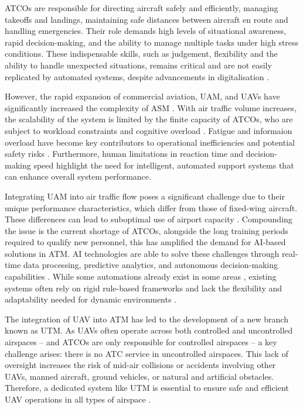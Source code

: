 \glspl{ATCO} are responsible for directing aircraft safely and efficiently, managing takeoffs and landings, maintaining safe distances between aircraft en route and handling emergencies. 
Their role demands high levels of situational awareness, rapid decision-making, and the ability to manage multiple tasks under high stress conditions.
These indispensable skills, such as judgement, flexibility and the ability to handle unexpected situations, remains critical and are not easily replicated by automated systems, despite advancements in digitalisation \cite{eurocontrol2024digitalisation}.

However, the rapid expansion of commercial aviation, \gls{UAM}, and \glspl{UAV} have significantly increased the complexity of \gls{ASM} \cite{Ramachandran_2025}.
With air traffic volume increases, the scalability of the system is limited by the finite capacity of \glspl{ATCO}, who are subject to workload constraints and cognitive overload \cite{Meier_2024}.
Fatigue and informaion overload  have become key contributors to operational inefficiencies and potential safety risks \cite{Ramachandran_2025}. 
Furthermore, human limitations in reaction time and decision-making speed highlight the need for intelligent, automated support systems that can enhance overall system performance.

Integrating \gls{UAM} into air traffic flow poses a significant challenge due to their unique performance characteristics, which differ from those of fixed-wing aircraft.
These differences can lead to suboptimal use of airport capacity \cite{Schuchardt_2023}.
Compounding the issue is the current shortage of \glspl{ATCO}, alongside the long training periods required to qualify new personnel, this has amplified the demand for \gls{AI}-based solutions in \gls{ATM}. 
\gls{AI} technologies are able to solve these challenges through real-time data processing, predictive analytics, and autonomous decision-making capabilities \cite{Ramachandran_2025}. 
While some automations already exist in some areas \cite{skybrary2025automation}, existing systems often rely on rigid rule-based frameworks and lack the flexibility and adaptability needed for dynamic environments \cite{Meier_2024}. 

The integration of \gls{UAV} into \gls{ATM} has led to the development of a new branch known as \gls{UTM}.
As \glspl{UAV} often operate across both controlled and uncontrolled airspaces -- and \glspl{ATCO} are only responsible for controlled airspaces -- a key challenge arises: there is no \gls{ATC} service in uncontrolled airspaces.
This lack of oversight increases the risk of mid-air collisions or accidents involving other \glspl{UAV}, manned aircraft, ground vehicles, or natural and artificial obstacles.
Therefore, a dedicated system like \gls{UTM} is essential to ensure safe and efficient \gls{UAV} operations in all types of airspace \cite{Zsolt_2017}.

